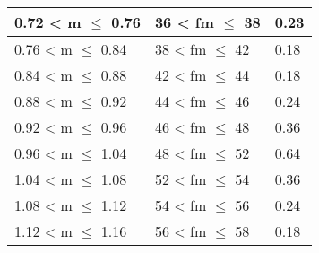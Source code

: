 \begin{table}[ht!]
\begin{tabular}{|l|l|l|}
		0.72 < m $\leq$ 0.76                                                                            & 36 < fm $\leq$ 38                                                                                                    & 0.23                        \\ \hline
		0.76 < m $\leq$ 0.84                                                                            & 38 < fm $\leq$ 42                                                                                                    & 0.18                        \\ \hline
		0.84 < m $\leq$ 0.88                                                                            & 42 < fm $\leq$ 44                                                                                                    & 0.18                        \\ \hline
		0.88 < m $\leq$ 0.92                                                                            & 44 < fm $\leq$ 46                                                                                                    & 0.24                        \\ \hline
		0.92 < m $\leq$ 0.96                                                                            & 46 < fm $\leq$ 48                                                                                                    & 0.36                        \\ \hline
		0.96 < m $\leq$ 1.04                                                                            & 48 < fm $\leq$ 52                                                                                                    & 0.64                        \\ \hline
		1.04 < m $\leq$ 1.08                                                                            & 52 < fm $\leq$ 54                                                                                                    & 0.36                        \\ \hline
		1.08 < m $\leq$ 1.12                                                                            & 54 < fm $\leq$ 56                                                                                                    & 0.24                        \\ \hline
		1.12 < m $\leq$ 1.16                                                                            & 56 < fm $\leq$ 58                                                                                                    & 0.18                        \\ \hline

\end{tabular}
\end{table}

